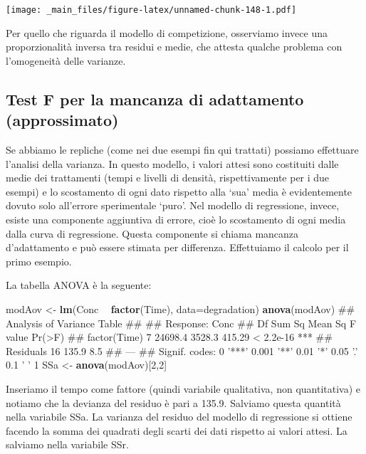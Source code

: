 \documentclass[a4paper,12pt,oneside]{book}
\newenvironment{Shaded}{\begin{snugshade}}{\end{snugshade}}
\newcommand{\KeywordTok}[1]{\textcolor[rgb]{0.13,0.29,0.53}{\textbf{#1}}}
\newcommand{\DataTypeTok}[1]{\textcolor[rgb]{0.13,0.29,0.53}{#1}}
\newcommand{\DecValTok}[1]{\textcolor[rgb]{0.00,0.00,0.81}{#1}}
\newcommand{\StringTok}[1]{\textcolor[rgb]{0.31,0.60,0.02}{#1}}
\newcommand{\OperatorTok}[1]{\textcolor[rgb]{0.81,0.36,0.00}{\textbf{#1}}}
\newcommand{\NormalTok}[1]{#1}
\theoremstyle{definition}
\theoremstyle{definition}
\theoremstyle{definition}
\theoremstyle{remark}
\begin{document}
\texttt{[image: \_main\_files/figure-latex/unnamed-chunk-148-1.pdf]}

Per quello che riguarda il modello di competizione, osserviamo invece
una proporzionalità inversa tra residui e medie, che attesta qualche
problema con l'omogeneità delle varianze.

\subsection{Test F per la mancanza di adattamento
(approssimato)}\label{test-f-per-la-mancanza-di-adattamento-approssimato}

Se abbiamo le repliche (come nei due esempi fin qui trattati) possiamo
effettuare l'analisi della varianza. In questo modello, i valori attesi
sono costituiti dalle medie dei trattamenti (tempi e livelli di densità,
rispettivamente per i due esempi) e lo scostamento di ogni dato rispetto
alla `sua' media è evidentemente dovuto solo all'errore sperimentale
`puro'. Nel modello di regressione, invece, esiste una componente
aggiuntiva di errore, cioè lo scostamento di ogni media dalla curva di
regressione. Questa componente si chiama mancanza d'adattamento e può
essere stimata per differenza. Effettuiamo il calcolo per il primo
esempio.

La tabella ANOVA è la seguente:

\begin{Shaded}
\begin{Highlighting}[]
\NormalTok{modAov <-}\StringTok{ }\KeywordTok{lm}\NormalTok{(Conc }\OperatorTok{~}\StringTok{ }\KeywordTok{factor}\NormalTok{(Time), }\DataTypeTok{data=}\NormalTok{degradation)}
\KeywordTok{anova}\NormalTok{(modAov)}
\NormalTok{## Analysis of Variance Table}
\NormalTok{## }
\NormalTok{## Response: Conc}
\NormalTok{##              Df  Sum Sq Mean Sq F value    Pr(>F)    }
\NormalTok{## factor(Time)  7 24698.4  3528.3  415.29 < 2.2e-16 ***}
\NormalTok{## Residuals    16   135.9     8.5                      }
\NormalTok{## ---}
\NormalTok{## Signif. codes:  0 '***' 0.001 '**' 0.01 '*' 0.05 '.' 0.1 ' ' 1}
\NormalTok{SSa <-}\StringTok{ }\KeywordTok{anova}\NormalTok{(modAov)[}\DecValTok{2}\NormalTok{,}\DecValTok{2}\NormalTok{]}
\end{Highlighting}
\end{Shaded}

Inseriamo il tempo come fattore (quindi variabile qualitativa, non
quantitativa) e notiamo che la devianza del residuo è pari a 135.9.
Salviamo questa quantità nella variabile SSa. La varianza del residuo
del modello di regressione si ottiene facendo la somma dei quadrati
degli scarti dei dati rispetto ai valori attesi. La salviamo nella
variabile SSr.
\end{document}

